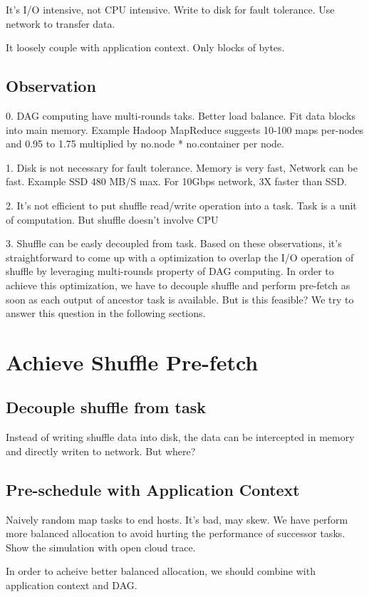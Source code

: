 \documentclass[10pt,twocolumn]{article}
\begin{document}
It's I/O intensive, not CPU intensive. Write to disk for fault tolerance. Use network to transfer data. 

It loosely couple with application context. Only blocks of bytes.
\subsection{Observation} \label{observation}
0. DAG computing have multi-rounds taks. Better load balance. Fit data blocks into main memory. 
Example Hadoop MapReduce suggests 10-100 maps per-nodes and 0.95 to 1.75 multiplied by no.node * no.container per node.\cite{hadooptutorial}

1. Disk is not necessary for fault tolerance. Memory is very fast, Network can be fast. Example SSD 480 MB/S max. 
For 10Gbps network, 3X faster than SSD.

2. It's not efficient to put shuffle read/write operation into a task. Task is a unit of computation. 
But shuffle doesn't involve CPU

3. Shuffle can be easly decoupled from task.
Based on these observations, it's straightforward to come up with a optimization to overlap the I/O operation of shuffle
by leveraging multi-rounds property of DAG computing. In order to achieve this optimization, we have to decouple shuffle and 
perform pre-fetch as soon as each output of ancestor task is available. But is this feasible? We try to answer this question
in the following sections.

\section{Achieve Shuffle Pre-fetch}
\subsection{Decouple shuffle from task}
Instead of writing shuffle data into disk, the data can be intercepted in memory and directly writen to network.
But where?
\subsection{Pre-schedule with Application Context}
Naively random map tasks to end hosts. It's bad, may skew. We have perform more balanced allocation to avoid hurting the performance of successor tasks.
Show the simulation with open cloud trace. 

In order to acheive better balanced allocation, we should combine with application context and DAG.
\end{document}
